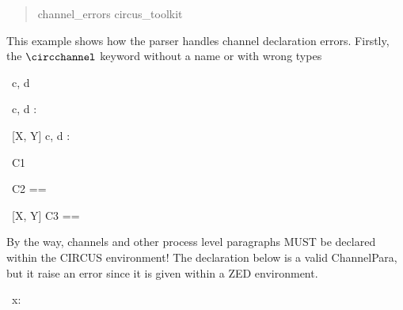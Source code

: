 \documentclass{article}
\newenvironment{zsection}{\begin{quotation}}{\end{quotation}}
\begin{document}
\begin{zsection}
   \SECTION channel\_errors \parents circus\_toolkit
\end{zsection}

This example shows how the parser handles channel declaration errors.
Firstly, the $\circchannel$ keyword without a name or with wrong types
%
\begin{circus}
    \circchannel
\end{circus}
%
\begin{cirucs}
    \circchannelfrom
\end{cirucs}
%
\begin{circus}
   \circchannel\ c, d \someunknowncmd
\end{circus}
%
\begin{circus}
   \circchannel\ c, d : \\
\end{circus}
%
\begin{circus}
   \circchannel\ [X, Y] c, d : \\
\end{circus}

\begin{circus}
    \circchannelset
\end{circus}

\begin{circus}
    \circchannelset\ C1 \\
\end{circus}

\begin{circus}
    \circchannelset\ C2 == \\
\end{circus}
\begin{circus}
    \circchannelset\ [X, Y] C3 ==
\end{circus}


By the way, channels and other process level paragraphs MUST
be declared within the CIRCUS environment! The declaration
below is a valid ChannelPara, but it raise an error since it 
is given within a ZED environment.
%
\begin{zed}
    \circchannel\ x: \nat   
\end{zed}
\end{document}
